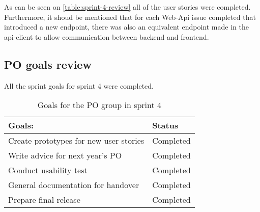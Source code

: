 As can be seen on \autoref{table:sprint-4-review} all of the user stories were completed. Furthermore, it shoud be mentioned that for each Web-Api issue completed that introduced a new endpoint, there was also an equivalent endpoint made in the api-client to allow communication between backend and frontend.

\subsection{PO goals review}
All the sprint goals for sprint 4 were completed.
\begin{table}[H]
    \centering
    \begin{tabular}{|l|l|}
    \hline
    Goals:  & Status \\ \hline
     Create prototypes for new user stories & Completed\\ \hline
     Write advice for next year's PO  & Completed  \\ \hline
     Conduct usability test & Completed  \\ \hline
     General documentation for handover & Completed \\ \hline
     Prepare final release & Completed  \\ \hline
    \end{tabular}
    \caption{Goals for the PO group in sprint 4}
\end{table}

